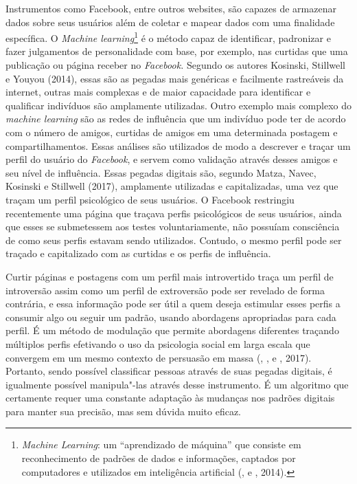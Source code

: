Instrumentos como Facebook, entre outros websites, são capazes de
armazenar dados sobre seus usuários além de coletar e mapear dados com
uma finalidade específica. O \emph{Machine learning}\footnote{\emph{Machine
  Learning}: um ``aprendizado de máquina'' que consiste em reconhecimento
  de padrões de dados e informações, captados por computadores e
  utilizados em inteligência artificial (,  e ,
  2014).} é o método capaz de identificar, padronizar e fazer julgamentos
de personalidade com base, por exemplo, nas curtidas que uma publicação
ou página receber no \emph{Facebook.} Segundo os autores
Kosinski, Stillwell e Youyou (2014), essas são as pegadas mais genéricas
e facilmente rastreáveis da internet, outras mais complexas e de maior
capacidade para identificar e qualificar indivíduos são amplamente
utilizadas. Outro exemplo mais complexo do \emph{machine learning} são
as redes de influência que um indivíduo pode ter de acordo com o número
de amigos, curtidas de amigos em uma determinada postagem e
compartilhamentos. Essas análises são utilizados de modo a descrever
e traçar um perfil do usuário do \emph{Facebook}, e servem como
validação através desses amigos e seu nível de influência. Essas pegadas
digitais são, segundo Matza, Navec, Kosinski e Stillwell (2017),
amplamente utilizadas e capitalizadas, uma vez que traçam um perfil
psicológico de seus usuários. O Facebook restringiu recentemente uma
página que traçava perfis psicológicos de seus usuários, ainda que esses
se submetessem aos testes voluntariamente, não possuíam consciência de
como seus perfis estavam sendo utilizados. Contudo, o mesmo perfil pode
ser traçado e capitalizado com as curtidas e os perfis de influência.

Curtir páginas e postagens com um perfil mais introvertido traça um
perfil de introversão assim como um perfil de extroversão pode ser
revelado de forma contrária, e essa informação pode ser útil a quem
deseja estimular esses perfis a consumir algo ou seguir um padrão,
usando abordagens apropriadas para cada perfil. É um método de modulação
que permite abordagens diferentes traçando múltiplos perfis efetivando o
uso da psicologia social em larga escala que convergem em um mesmo
contexto de persuasão em massa (, ,  e , 2017).
Portanto, sendo possível classificar pessoas através de suas pegadas
digitais, é igualmente possível manipula"-las através desse instrumento.
É um algoritmo que certamente requer uma constante adaptação às mudanças
nos padrões digitais para manter sua precisão, mas sem dúvida muito
eficaz.

